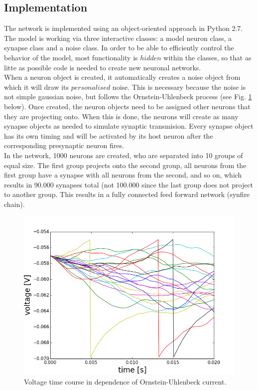 \documentclass[12pt,a4paper, bibliography=totoc, listof=numbered, footexclude]{scrartcl}
\begin{document}
  \subsection{Implementation}
  The network is implemented using an object-oriented approach in Python 2.7. The model is working via three interactive classes: a model neuron class, a synapse class and a noise class. In order to be able to efficiently control the behavior of the model, most functionality is $hidden$ within the classes, so that as litte as possible code is needed to create new neuronal networks.\\
  When a neuron object is created, it automatically creates a noise object from which it will draw its $personalised$ noise. This is necessary because the noise is not simple gaussian noise, but follows the Ornstein-Uhlenbeck process (see Fig. \ref{fig:noise} below). Once created, the neuron objects need to be assigned other neurons that they are projecting onto. When this is done, the neurons will create as many synapse objects as needed to simulate synaptic transmision. Every synapse object has its own timing and will be activated by its host neuron after the corresponding presynaptic neuron fires.\\
  In the network, 1000 neurons are created, who are separated into 10 groups of equal size. The first group projects onto the second group, all neurons from the first group have a synapse with all neurons from the second, and so on, which results in 90.000 synapses total (not 100.000 since the last group does not project to another group. This results in a fully connected feed forward network (synfire chain).
    	\begin{figure}[H]
  
    	  		\centering
    	  		  \includegraphics[width=0.8\linewidth]{./Plots/Our_Plots/noise_grosse_schrift}
  
    
    			  \caption{ Voltage time course in dependence of Ornstein-Uhlenbeck current. }
      	  		  \label{fig:noise}
   
    	    	
    	    	\end{figure}
  
\end{document}
